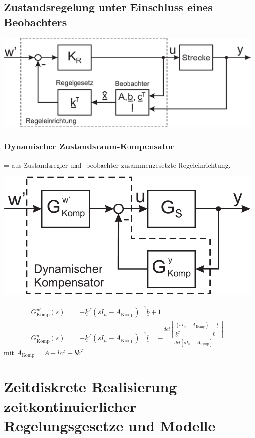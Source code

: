 \documentclass[a4paper,twocolumn,10pt]{article}
\begin{document}
\subsection{Zustandsregelung unter Einschluss eines Beobachters}
\begin{center}
\includegraphics[width=0.95\columnwidth]{Grafiken/Zustandsregler_mit_Beobachter}
\end{center}

\subsubsection{Dynamischer Zustandsraum-Kompensator}
= aus Zustandsregler und -beobachter zusammengesetzte Regeleinrichtung.
\begin{center}
\includegraphics[width=0.6\columnwidth]{Grafiken/Zustandsraum-Kompensator}
\end{center}
\begin{equation*}
\begin{split}
G_{\text{Komp}}^{w'}(s)&=-\underline{k}^T(sI_n-A_{\text{Komp}})^{-1}\underline{b}+1\\
G_{\text{Komp}}^y(s)&=-\underline{k}^T(sI_n-A_{\text{Komp}})^{-1}\underline{l}=-\frac{det\begin{bmatrix}(sI_n-A_{\text{Komp}}) & -\underline{l} \\ \underline{k}^T & 0\end{bmatrix}}{det[sI_n-A_{\text{Komp}}]}
\end{split}
\end{equation*}
mit $A_{\text{Komp}}=A-\underline{l}\underline{c}^T-\underline{b}\underline{k}^T$

\section{Zeitdiskrete Realisierung zeitkontinuierlicher Regelungsgesetze und Modelle}
\end{document}
